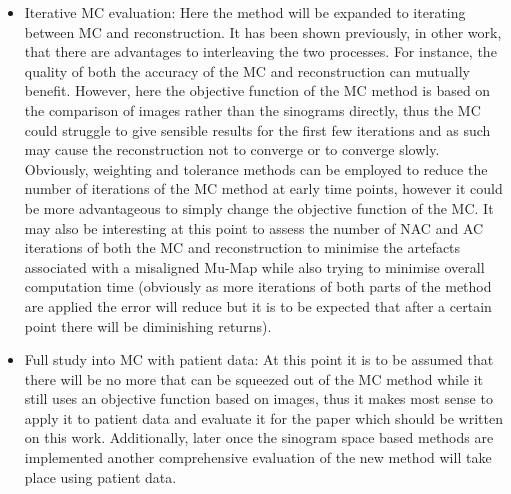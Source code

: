 \begin{itemize}
                \item Iterative \gls{MC} evaluation: Here the method will be expanded to iterating between \gls{MC} and reconstruction. It has been shown previously, in other work, that there are advantages to interleaving the two processes. For instance, the quality of both the accuracy of the \gls{MC} and reconstruction can mutually benefit. However, here the objective function of the \gls{MC} method is based on the comparison of images rather than the sinograms directly, thus the \gls{MC} could struggle to give sensible results for the first few iterations and as such may cause the reconstruction not to converge or to converge slowly. Obviously, weighting and tolerance methods can be employed to reduce the number of iterations of the \gls{MC} method at early time points, however it could be more advantageous to simply change the objective function of the \gls{MC}. It may also be interesting at this point to assess the number of \gls{NAC} and \gls{AC} iterations of both the \gls{MC} and reconstruction to minimise the artefacts associated with a misaligned \gls{Mu-Map} while also trying to minimise overall computation time (obviously as more iterations of both parts of the method are applied the error will reduce but it is to be expected that after a certain point there will be diminishing returns).
    
                \item Full study into \gls{MC} with patient data: At this point it is to be assumed that there will be no more that can be squeezed out of the \gls{MC} method while it still uses an objective function based on images, thus it makes most sense to apply it to patient data and evaluate it for the paper which should be written on this work. Additionally, later once the sinogram space based methods are implemented another comprehensive evaluation of the new method will take place using patient data.
    

\end{itemize}

